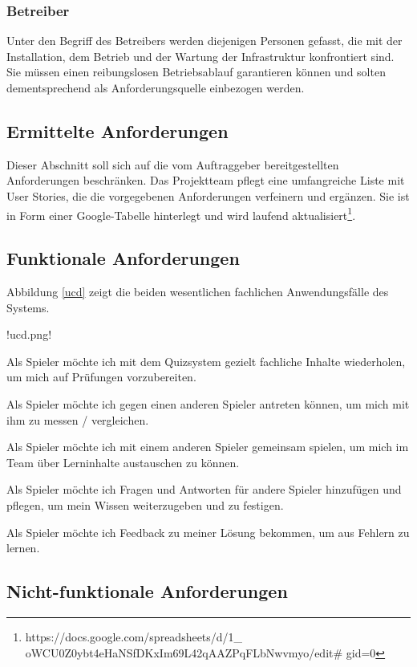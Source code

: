 \documentclass[a4paper,11pt,listof=numbered,glossary=totoc,parskip=half,toc=bib]{scrreprt}
\begin{document}
\subsubsection{Betreiber}

Unter den Begriff des Betreibers werden diejenigen Personen gefasst, die mit der Installation, dem Betrieb und der Wartung der Infrastruktur konfrontiert sind.
Sie müssen einen reibungslosen Betriebsablauf garantieren können und solten dementsprechend als Anforderungsquelle einbezogen werden.

\subsection{Ermittelte Anforderungen }

Dieser Abschnitt soll sich auf die vom Auftraggeber bereitgestellten Anforderungen beschränken. Das Projektteam pflegt eine umfangreiche Liste mit User Stories, die die vorgegebenen Anforderungen verfeinern und ergänzen. Sie ist in Form einer Google-Tabelle hinterlegt und wird laufend aktualisiert\footnote{https://docs.google.com/spreadsheets/d/1\_ oWCU0Z0ybt4eHaNSfDKxIm69L42qAAZPqFLbNwvmyo/edit\# gid=0}.

\subsection{Funktionale Anforderungen}

Abbildung \ref{ucd} zeigt die beiden wesentlichen fachlichen Anwendungsfälle des Systems.

!ucd.png!

Als Spieler möchte ich mit dem Quizsystem gezielt fachliche Inhalte wiederholen, um mich auf Prüfungen vorzubereiten.

Als Spieler möchte ich gegen einen anderen Spieler antreten können, um mich mit ihm zu messen / vergleichen.

Als Spieler möchte ich mit einem anderen Spieler gemeinsam spielen, um mich im Team über Lerninhalte austauschen zu können.

Als Spieler möchte ich Fragen und Antworten für andere Spieler hinzufügen und pflegen, um mein Wissen weiterzugeben und zu festigen.

Als Spieler möchte ich Feedback zu meiner Lösung bekommen, um aus Fehlern zu lernen.


\subsection{Nicht-funktionale Anforderungen}
\end{document}
